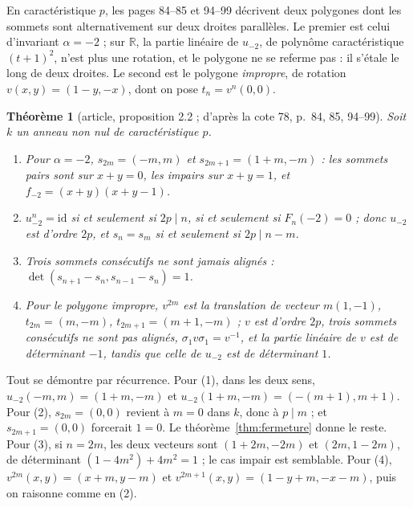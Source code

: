 \documentclass[11pt,a4paper]{amsart}
\theoremstyle{definition}
\theoremstyle{plain}
\newtheorem{theoreme}{Théorème}
\theoremstyle{remark}
\newcommand{\R}{\mathbb R}
\newcommand{\id}{\mathrm{id}}
\begin{document}
En caractéristique $p$, les pages 84--85 et 94--99 décrivent deux polygones dont les sommets sont alternativement sur deux droites parallèles. Le premier est celui d'invariant $\alpha = -2$ ; sur $\R$, la partie linéaire de $u_{-2}$, de polynôme caractéristique $(t+1)^2$, n'est plus une rotation, et le polygone ne se referme pas : il s'étale le long de deux droites. Le second est le polygone \emph{impropre}, de rotation $v(x,y) = (1 - y, -x)$, dont on pose $t_n = v^n(0,0)$.

\begin{theoreme}[article, proposition 2.2 ; d'après la cote 78, p.~84, 85, 94--99]
Soit $k$ un anneau non nul de caractéristique $p$.
\begin{enumerate}
\item Pour $\alpha = -2$, $s_{2m} = (-m, m)$ et $s_{2m+1} = (1+m, -m)$ : les sommets pairs sont sur $x + y = 0$, les impairs sur $x + y = 1$, et $f_{-2} = (x+y)(x+y-1)$.
\item $u_{-2}^n = \id$ si et seulement si $2p \mid n$, si et seulement si $F_n(-2) = 0$ ; donc $u_{-2}$ est d'ordre $2p$, et $s_n = s_m$ si et seulement si $2p \mid n - m$.
\item Trois sommets consécutifs ne sont jamais alignés : $\det(s_{n+1} - s_n, s_{n-1} - s_n) = 1$.
\item Pour le polygone impropre, $v^{2m}$ est la translation de vecteur $m(1,-1)$, $t_{2m} = (m, -m)$, $t_{2m+1} = (m+1, -m)$ ; $v$ est d'ordre $2p$, trois sommets consécutifs ne sont pas alignés, $\sigma_1 v \sigma_1 = v^{-1}$, et la partie linéaire de $v$ est de déterminant $-1$, tandis que celle de $u_{-2}$ est de déterminant $1$.
\end{enumerate}
\end{theoreme}

Tout se démontre par récurrence. Pour (1), dans les deux sens, $u_{-2}(-m, m) = (1+m, -m)$ et $u_{-2}(1+m, -m) = (-(m+1), m+1)$. Pour (2), $s_{2m} = (0,0)$ revient à $m = 0$ dans $k$, donc à $p \mid m$ ; et $s_{2m+1} = (0,0)$ forcerait $1 = 0$. Le théorème~\ref{thm:fermeture} donne le reste. Pour (3), si $n = 2m$, les deux vecteurs sont $(1+2m, -2m)$ et $(2m, 1-2m)$, de déterminant $(1 - 4m^2) + 4m^2 = 1$ ; le cas impair est semblable. Pour (4), $v^{2m}(x,y) = (x+m, y-m)$ et $v^{2m+1}(x,y) = (1-y+m, -x-m)$, puis on raisonne comme en (2).
\end{document}
